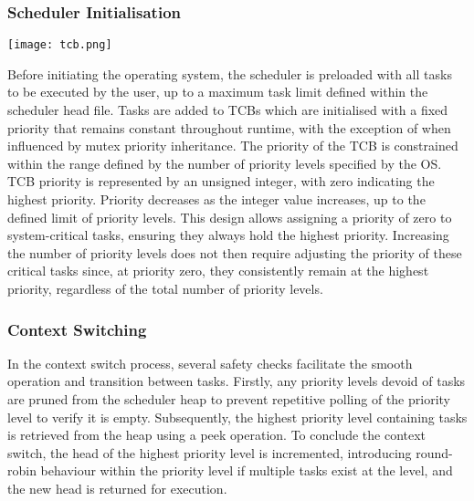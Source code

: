 \subsubsection{Scheduler Initialisation}
\begin{center}
	\texttt{[image: tcb.png]}
\end{center}
Before initiating the operating system, the scheduler is preloaded with all tasks to be executed by the user, up to a maximum task limit defined within the scheduler head file. Tasks are added to TCBs which are initialised with a fixed priority that remains constant throughout runtime, with the exception of when influenced by mutex priority inheritance. The priority of the TCB is constrained within the range defined by the number of priority levels specified by the OS.\hfill\newline
TCB priority is represented by an unsigned integer, with zero indicating the highest priority. Priority decreases as the integer value increases, up to the defined limit of priority levels. This design allows assigning a priority of zero to system-critical tasks, ensuring they always hold the highest priority. Increasing the number of priority levels does not then require adjusting the priority of these critical tasks since, at priority zero, they consistently remain at the highest priority, regardless of the total number of priority levels. 

\subsubsection{Context Switching}
In the context switch process, several safety checks facilitate the smooth operation and transition between tasks. Firstly, any priority levels devoid of tasks are pruned from the scheduler heap to prevent repetitive polling of the priority level to verify it is empty. Subsequently, the highest priority level containing tasks is retrieved from the heap using a peek operation.\hfill\newline
To conclude the context switch, the head of the highest priority level is incremented, introducing round-robin behaviour within the priority level if multiple tasks exist at the level, and the new head is returned for execution.

